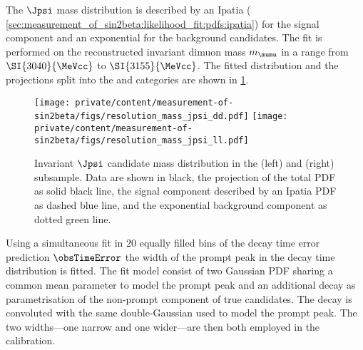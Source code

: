 The $\Jpsi$ mass distribution is described by an Ipatia \PDF (\cf
\cref{sec:measurement_of_sin2beta:likelihood_fit:pdfs:ipatia}) for the signal
component and an exponential \PDF for the background candidates. The fit is
performed on the reconstructed invariant dimuon mass $m_{\mumu}$ in a range from
$\SI{3040}{\MeVcc}$ to $\SI{3155}{\MeVcc}$. The fitted distribution and the \PDF
projections split into the \catDD and \catLL categories are shown in 
\cref{fig:measurement_of_sin2beta:resolution_and_acceptance:resolution:jpsi_mass}.
%
\begin{figure}[h]
\texttt{[image: private/content/measurement-of-sin2beta/figs/resolution\_mass\_jpsi\_dd.pdf]}
\texttt{[image: private/content/measurement-of-sin2beta/figs/resolution\_mass\_jpsi\_ll.pdf]}
\label{fig:measurement_of_sin2beta:resolution_and_acceptance:resolution:jpsi_mass}
\caption{Invariant $\Jpsi$ candidate mass distribution in the (left) \catDD and
(right) \catLL subsample. Data are shown in black, the projection of the total
\acs{PDF} as solid black line, the signal component described by an Ipatia
\acs{PDF} as dashed blue line, and the exponential background component as
dotted green line.}
\end{figure}
%
Using a simultaneous fit in $\num{20}$ equally filled bins of the decay time
error prediction $\obsTimeError$ the width of the prompt peak in the decay time
distribution is fitted. The fit model consist of two Gaussian \acs{PDF} sharing
a common mean parameter to model the prompt peak and an additional decay \PDF as
parametrisation of the non-prompt component of true \BdToJpsiKS candidates. The
decay \PDF is convoluted with the same double-Gaussian \PDF used to model the
prompt peak. The two widths---one narrow and one wider---are then both employed
in the calibration.

